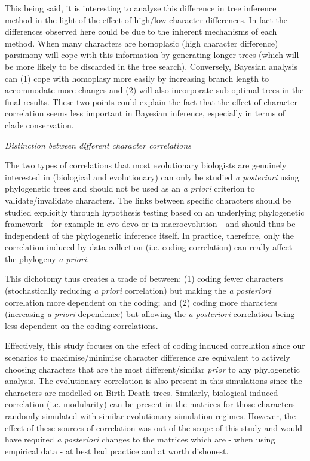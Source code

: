 \documentclass[12pt,letterpaper]{article}
\renewcommand{\subsection}[1]{%
\bigskip
\begin{center}
\begin{large}
\normalfont\itshape #1
\end{large}
\end{center}}
\begin{document}
This being said, it is interesting to analyse this difference in tree inference method in the light of the effect of high/low character differences.
In fact the differences observed here could be due to the inherent mechanisms of each method.
When many characters are homoplasic (high character difference) parsimony will cope with this information by generating longer trees (which will be more likely to be discarded in the tree search).
Conversely, Bayesian analysis can (1) cope with homoplasy more easily by increasing branch length to accommodate more changes and (2) will also incorporate sub-optimal trees in the final results.
These two points could explain the fact that the effect of character correlation seems less important in Bayesian inference, especially in terms of clade conservation.

\subsection{Distinction between different character correlations}
The two types of correlations that most evolutionary biologists are genuinely interested in (biological and evolutionary) can only be studied \textit{a posteriori} using phylogenetic trees and should not be used as an \textit{a priori} criterion to validate/invalidate characters.
The links between specific characters should be studied explicitly through hypothesis testing based on an underlying phylogenetic framework - for example in evo-devo \citep[e.g.][]{goswami2006morphological} or in macroevolution \citep[e.g.][]{fitzjohn2014much} - and should thus be independent of the phylogenetic inference itself.
In practice, therefore, only the correlation induced by data collection (i.e. coding correlation) can really affect the phylogeny \textit{a priori}.

This dichotomy thus creates a trade of between: (1) coding fewer characters (stochastically reducing \textit{a priori} correlation) but making the \textit{a posteriori} correlation more dependent on the coding; and (2) coding more characters (increasing \textit{a priori} dependence) but allowing the \textit{a posteriori} correlation being less dependent on the coding correlations.

Effectively, this study focuses on the effect of coding induced correlation since our scenarios to maximise/minimise character difference are equivalent to actively choosing characters that are the most different/similar \textit{prior} to any phylogenetic analysis.
The evolutionary correlation is also present in this simulations since the characters are modelled on Birth-Death trees.
Similarly, biological induced correlation (i.e. modularity) can be present in the matrices for those characters randomly simulated with similar evolutionary simulation regimes.
However, the effect of these sources of correlation was out of the scope of this study and would have required \textit{a posteriori} changes to the matrices which are - when using empirical data - at best bad practice and at worth dishonest.
\end{document}

